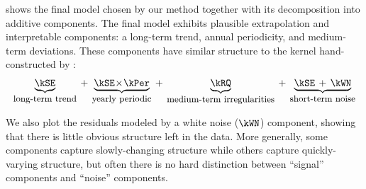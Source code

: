  shows the final model chosen by our method together with its decomposition into additive components.
The final model exhibits plausible extrapolation and interpretable components: a long-term trend, annual periodicity, and medium-term deviations.
These components have similar structure to the kernel hand-constructed by \citet[chapter 5]{rasmussen38gaussian}:
%
\begin{align}
\underwrite{\kSE}{\small long-term trend}
\kernplus
\underwrite{\kSE \kerntimes \kPer}{\small yearly periodic}
\kernplus
\underwrite{\kRQ}{\small medium-term irregularities}
\kernplus 
\underwrite{\kSE \kernplus \kWN}{\small short-term noise}
\end{align}

We also plot the residuals modeled by a white noise ($\kWN$) component, showing that there is little obvious structure left in the data.
More generally, some components capture slowly-changing structure while others capture quickly-varying structure, but often there is no hard distinction between ``signal'' components and ``noise'' components.

